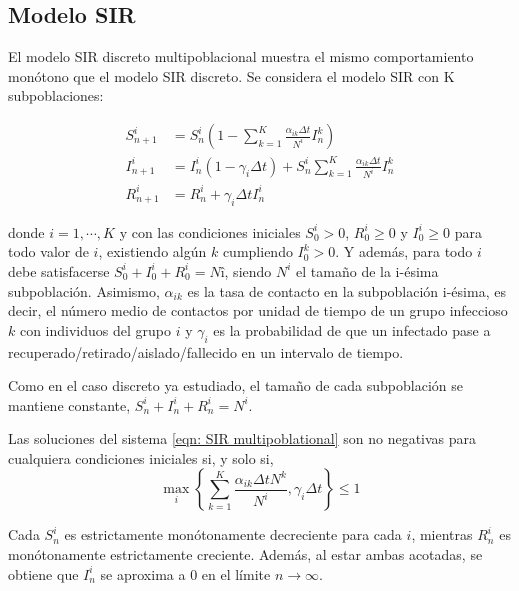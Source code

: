 \subsection{Modelo SIR}

El modelo SIR discreto multipoblacional muestra el mismo comportamiento monótono que el modelo SIR discreto. Se considera el modelo SIR con K subpoblaciones:

\begin{equation}
\label{eqn: SIR multipoblational}
\begin{aligned}
S_{n+1}^i &= S_n^i \left( 1- \sum_{k=1}^{K} \frac{\alpha_{ik}\Delta t}{N^i}I_n^k \right) \\
I_{n+1}^i &= I_n^i (1-\gamma_i\Delta t) + S_n^i\sum_{k=1}^{K}\frac{\alpha_{ik}\Delta t}{N^i}I_n^k \\
R_{n+1}^i &= R_n^i+\gamma_i\Delta t I_n^i
\end {aligned}
\end{equation}

donde $i=1, \cdots , K$ y con las condiciones iniciales $S_0^i > 0$, $R_0^i \geq 0$ y $I_0^i\geq 0$ para todo valor de $i$, existiendo algún $k$ cumpliendo $I_0^k>0$. Y además, para todo $i$ debe satisfacerse $S_0^i+I_0^i+R_0^i=Nî$, siendo $N^i$ el tamaño de la i-ésima subpoblación. Asimismo, $\alpha_{ik}$ es la tasa de contacto en la subpoblación i-ésima, es decir, el número medio de contactos por unidad de tiempo de un grupo infeccioso $k$ con individuos del grupo $i$ y $\gamma_i$ es la probabilidad de que un infectado pase a recuperado/retirado/aislado/fallecido en un intervalo de tiempo.

Como en el caso discreto ya estudiado, el tamaño de cada subpoblación se mantiene constante, $S_n^i+I_n^i+R_n^i=N^i$.

\begin{proposition}
Las soluciones del sistema \eqref{eqn: SIR multipoblational} son no negativas para cualquiera condiciones iniciales si, y solo si,
$$\max_i \left\{ \sum_{k=1}^{K} \frac{\alpha_{ik}\Delta t N^k}{N^i}, \gamma_i\Delta t \right\} \leq 1$$
\end{proposition}

\begin{proposition}
Cada $S_n^i$ es estrictamente monótonamente decreciente para cada $i$, mientras $R_n^i$ es monótonamente estrictamente creciente. Además, al estar ambas acotadas, se obtiene que $I_n^i$ se aproxima a $0$ en el límite $n\rightarrow \infty$. 
\end{proposition}

